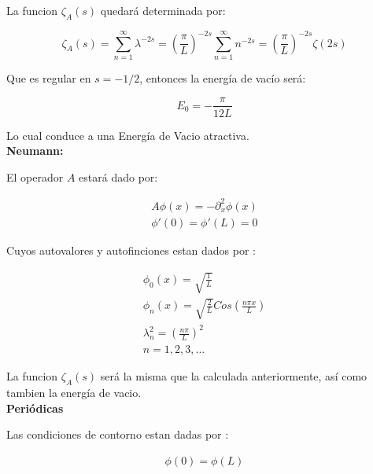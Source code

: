 La funcion $\zeta _A (s)$ quedará determinada por:

\begin{equation}
\zeta _A (s) = 
\sum _{n=1} ^{\infty} \lambda ^{-2s} =  
\left( \frac{\pi}{L} \right) ^{-2s} \sum _{n=1} ^{\infty} n ^{-2s} = 
\left( \frac{\pi}{L} \right) ^{-2s} \zeta (2s)
\end{equation}

Que es regular en $s=-1/2$, entonces la energía de vacío será:

\begin{equation}
E _0 = - \frac{\pi}{12 L}
\end{equation}

Lo cual conduce a una Energía de Vacio atractiva. \\

\textbf{Neumann:}

El operador $A$ estará dado por:

\begin{equation}
\begin{array}{c}
	A \phi (x) = - \partial _x ^2 \phi (x) \\
    \phi ' (0) = \phi ' (L) = 0 
\end{array}
\end{equation}



Cuyos autovalores y autofinciones estan dados por  : 

\begin{equation}
\begin{array}{c}
	\phi _0 (x) = \sqrt{ \frac{1}{L} } \\
	\phi _n (x)  = \sqrt{\frac{2}{L}} Cos( \frac{n \pi x}{L} ) \\
	\lambda _n ^2 = \left( \frac{n \pi }{L} \right) ^2 \\
	n = 1,2,3, ...
\end{array}
\end{equation}

La funcion $\zeta _A (s)$ será la misma que la calculada anteriormente, así como tambien la energía de vacio. \\

\textbf{Periódicas}

Las condiciones de contorno estan dadas por : 

\begin{equation}
\begin{array}{c}
    \phi (0) = \phi (L)  \\ 
\end{array}
\end{equation}


